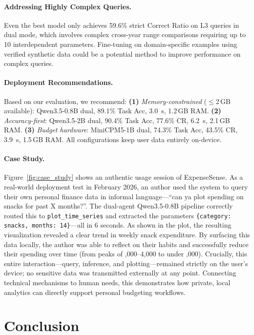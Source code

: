 \documentclass[11pt,twocolumn]{article}
\begin{document}
\paragraph{Addressing Highly Complex Queries.}
Even the best model only achieves 59.6\% strict Correct Ratio on L3
queries in dual mode, which involves complex cross-year range comparisons
requiring up to 10 interdependent parameters.
Fine-tuning on domain-specific examples using verified synthetic data
\citep{liu2024apigen} could be a potential method to improve performance on
complex queries.

\paragraph{Deployment Recommendations.}
Based on our evaluation, we recommend:
\textbf{(1)} \emph{Memory-constrained} ($\leq$2\,GB available):
Qwen3.5-0.8B dual, 89.1\% Task Acc, 3.0~s, 1.2\,GB RAM.
\textbf{(2)} \emph{Accuracy-first}: Qwen3.5-2B dual, 90.4\% Task
Acc, 77.6\% CR, 6.2~s, 2.1\,GB RAM.
\textbf{(3)} \emph{Budget hardware}: MiniCPM5-1B dual, 74.3\% Task
Acc, 43.5\% CR, 3.9~s, 1.5\,GB RAM.
All configurations keep user data entirely on-device.

\paragraph{Case Study.}
Figure~\ref{fig:case_study} shows an authentic usage session of ExpenseSense.
As a real-world deployment test in February 2026, an author used the system to query their own personal finance data in informal language---``can ya plot spending
on snacks for past X months?''. The dual-agent Qwen3.5-0.8B
pipeline correctly routed this to \texttt{plot\_time\_series} and extracted
the parameters \texttt{\{category: snacks, months: 14\}}---all in 6 seconds.
As shown in the plot, the resulting visualization revealed a clear trend in weekly
snack expenditure. By surfacing this data locally, the author was able to reflect on their habits and successfully reduce their spending over time (from peaks of ,000--4,000 to under
,000). Crucially, this entire interaction---query, inference, and
plotting---remained strictly on the user's device; no sensitive data was transmitted
externally at any point. Connecting technical mechanisms to human needs, this demonstrates how private, local analytics can directly support personal budgeting workflows.

\vspace{-5pt}
\section{Conclusion}
\label{sec:conclusion}
\vspace{-3pt}
\end{document}
